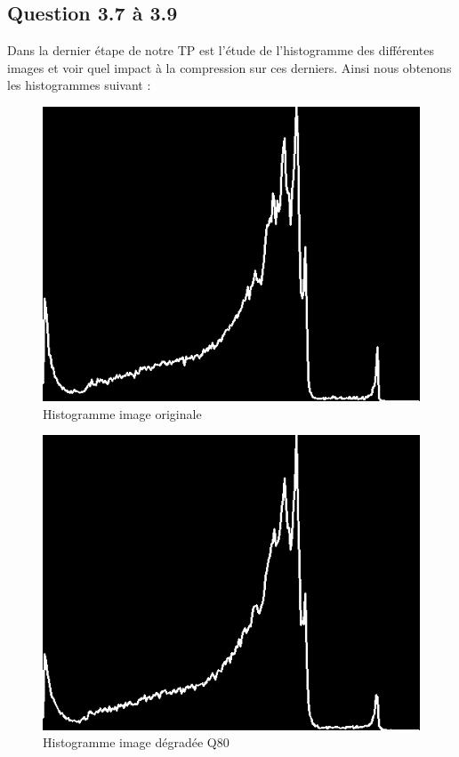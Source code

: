 \documentclass[12pt]{report}
\begin{document}
\newpage
\subsection{Question 3.7 à 3.9}

Dans la dernier étape de notre TP est l'étude de l'histogramme des différentes images et voir quel impact à la compression sur ces derniers. Ainsi nous obtenons les histogrammes suivant :

\begin{figure}[H]
\begin{center}
\includegraphics[scale=0.5]{../ImageRes/hist_0.jpg} 
\caption{Histogramme image originale}
\end{center}
\end{figure}

\begin{figure}[H]
\begin{center}
\includegraphics[scale=0.5]{../ImageRes/hist_1.jpg} 
\caption{Histogramme image dégradée Q80 }
\end{center}
\end{figure}
\end{document}
